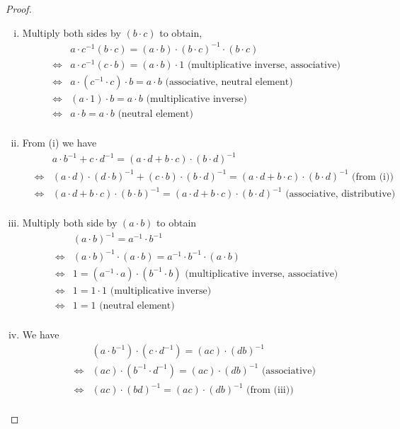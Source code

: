 \documentclass[10pt,letterpaper]{article}
\begin{document}
\begin{proof}
	\text{ }
	\begin{enumerate}[(i)]
	\item  Multiply both sides by $(b \cdot c)$ to obtain, 
	\begin{eqnarray*}
		& & a \cdot c^{-1} (b \cdot c) = (a \cdot b) \cdot (b \cdot c)^{-1} \cdot (b \cdot c) \\
		&\Leftrightarrow & a \cdot c^{-1} (c \cdot b) = (a \cdot b) \cdot 1 \text{ (multiplicative inverse, associative)} \\
		&\Leftrightarrow & a \cdot (c^{-1} \cdot c) \cdot b = a \cdot b \text{ (associative, neutral element)} \\
		&\Leftrightarrow & (a \cdot 1) \cdot b = a \cdot b \text{ (multiplicative inverse)}\\
		&\Leftrightarrow & a \cdot b = a \cdot b \text{ (neutral element)}\\
	\end{eqnarray*}
	\item From (i) we have
	\begin{eqnarray*}
		& &  a \cdot b^{-1} + c \cdot d^{-1} = (a \cdot d + b \cdot c) \cdot (b \cdot d)^{-1} \\
		&\Leftrightarrow & (a \cdot d) \cdot (d \cdot b)^{-1} + (c \cdot b) \cdot (b \cdot d)^{-1} =
		(a \cdot d + b \cdot c) \cdot (b \cdot d)^{-1}
		\text{ (from (i))} \\
		&\Leftrightarrow & (a \cdot d + b \cdot c) \cdot (b \cdot b)^{-1} =
		(a \cdot d + b \cdot c) \cdot (b \cdot d)^{-1}
		\text{ (associative, distributive)} \\
	\end{eqnarray*}
	\item Multiply both side by $(a \cdot b)$ to obtain
	\begin{eqnarray*}
		& & (a \cdot b)^{-1} = a^{-1} \cdot b^{-1} \\
		& \Leftrightarrow & (a \cdot b)^{-1} \cdot (a \cdot b) = a^{-1} \cdot b^{-1} \cdot (a \cdot b) \\
		& \Leftrightarrow & 1 = (a^{-1} \cdot a) \cdot (b^{-1} \cdot b) 
		\text{ (multiplicative inverse, associative)}\\
		& \Leftrightarrow & 1 = 1 \cdot 1 
		\text{ (multiplicative inverse)}\\
		& \Leftrightarrow & 1 = 1 
		\text{ (neutral element)}\\
	\end{eqnarray*}
	
	\item We have
	\begin{eqnarray*}
	& & (a \cdot b^{-1}) \cdot (c \cdot d^{-1}) = (ac) \cdot (db)^{-1} \\
	& \Leftrightarrow & (ac) \cdot (b^{-1} \cdot d^{-1}) = (ac) \cdot (db)^{-1} 
	\text{ (associative) }\\
	& \Leftrightarrow & (ac) \cdot (bd)^{-1} = (ac) \cdot (db)^{-1} 
	\text{ (from (iii)) }\\
	\end{eqnarray*}
	

\end{enumerate}
\end{proof}
\end{document}
